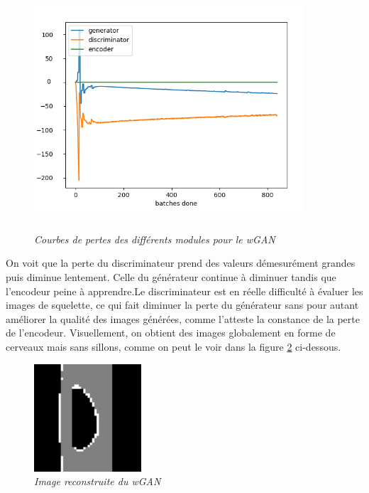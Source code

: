 \documentclass[12pt, oneside, a4paper, titlepage]{article}
\begin{document}
\begin{figure}[H]
    \centering
\includegraphics[width=10cm, height=9cm]{wgan.png}
    \caption{\textit{Courbes de pertes des différents modules pour le wGAN}}
    \label{fig:perte_wGAN}
\end{figure}

On voit que la perte du discriminateur prend des valeurs démesurément grandes puis diminue lentement. Celle du générateur continue à diminuer tandis que l'encodeur peine à apprendre.Le discriminateur est en réelle difficulté à évaluer les images de squelette, ce qui fait diminuer la perte du générateur sans pour autant améliorer la qualité des images générées, comme l'atteste la constance de la perte de l'encodeur. Visuellement, on obtient des images globalement en forme de cerveaux mais sans sillons, comme on peut le voir dans la figure \ref{fig:res_wGAN} ci-dessous.

\begin{figure}[H]
    \centering
\includegraphics[width=4cm, height=4cm]{target1_60.png}
    \caption{\textit{Image reconstruite du wGAN}}
    \label{fig:res_wGAN}
\end{figure}
\end{document}
